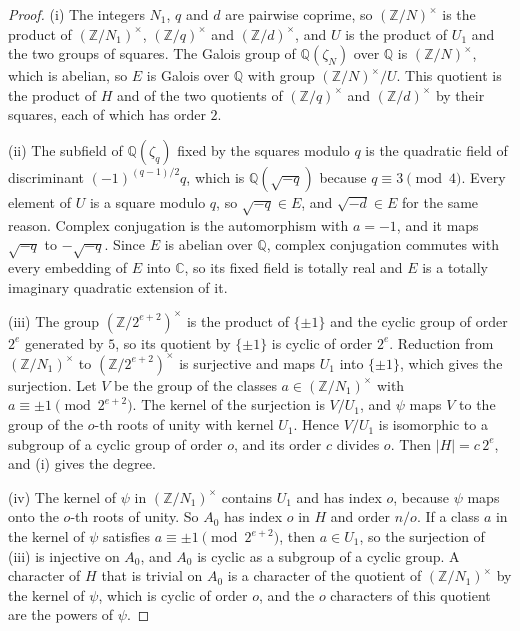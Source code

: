 \documentclass[11pt,letterpaper]{article}
\numberwithin{equation}{section}
\begin{document}
\begin{proof}
(i) The integers $N_1$, $q$ and $d$ are pairwise coprime, so $(\mathbb Z/N)^\times$ is the product of $(\mathbb Z/N_1)^\times$, $(\mathbb Z/q)^\times$ and $(\mathbb Z/d)^\times$, and $U$ is the product of $U_1$ and the two groups of squares. The Galois group of $\mathbb Q(\zeta_N)$ over $\mathbb Q$ is $(\mathbb Z/N)^\times$, which is abelian, so $E$ is Galois over $\mathbb Q$ with group $(\mathbb Z/N)^\times/U$. This quotient is the product of $H$ and of the two quotients of $(\mathbb Z/q)^\times$ and $(\mathbb Z/d)^\times$ by their squares, each of which has order $2$.

(ii) The subfield of $\mathbb Q(\zeta_q)$ fixed by the squares modulo $q$ is the quadratic field of discriminant $(-1)^{(q-1)/2}q$, which is $\mathbb Q(\sqrt{-q})$ because $q\equiv3\pmod4$. Every element of $U$ is a square modulo $q$, so $\sqrt{-q}\in E$, and $\sqrt{-d}\in E$ for the same reason. Complex conjugation is the automorphism with $a=-1$, and it maps $\sqrt{-q}$ to $-\sqrt{-q}$. Since $E$ is abelian over $\mathbb Q$, complex conjugation commutes with every embedding of $E$ into $\mathbb C$, so its fixed field is totally real and $E$ is a totally imaginary quadratic extension of it.

(iii) The group $(\mathbb Z/2^{e+2})^\times$ is the product of $\{\pm1\}$ and the cyclic group of order $2^e$ generated by $5$, so its quotient by $\{\pm1\}$ is cyclic of order $2^e$. Reduction from $(\mathbb Z/N_1)^\times$ to $(\mathbb Z/2^{e+2})^\times$ is surjective and maps $U_1$ into $\{\pm1\}$, which gives the surjection. Let $V$ be the group of the classes $a\in(\mathbb Z/N_1)^\times$ with $a\equiv\pm1\pmod{2^{e+2}}$. The kernel of the surjection is $V/U_1$, and $\psi$ maps $V$ to the group of the $o$-th roots of unity with kernel $U_1$. Hence $V/U_1$ is isomorphic to a subgroup of a cyclic group of order $o$, and its order $c$ divides $o$. Then $|H|=c\,2^e$, and (i) gives the degree.

(iv) The kernel of $\psi$ in $(\mathbb Z/N_1)^\times$ contains $U_1$ and has index $o$, because $\psi$ maps onto the $o$-th roots of unity. So $A_0$ has index $o$ in $H$ and order $n/o$. If a class $a$ in the kernel of $\psi$ satisfies $a\equiv\pm1\pmod{2^{e+2}}$, then $a\in U_1$, so the surjection of (iii) is injective on $A_0$, and $A_0$ is cyclic as a subgroup of a cyclic group. A character of $H$ that is trivial on $A_0$ is a character of the quotient of $(\mathbb Z/N_1)^\times$ by the kernel of $\psi$, which is cyclic of order $o$, and the $o$ characters of this quotient are the powers of $\psi$.
\end{proof}
\end{document}
